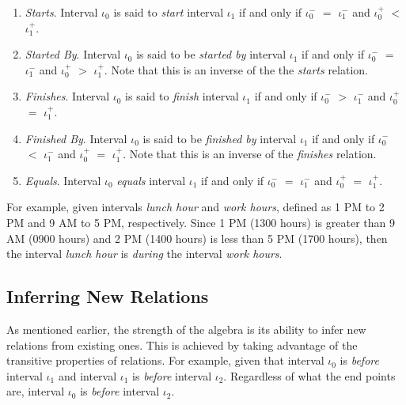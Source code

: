 \documentclass[11pt]{report}
\begin{document}
\begin{enumerate}
          \item
            {\em Starts}.
            Interval $\iota_0$ is said to {\em start} interval $\iota_1$ if and
            only if $\iota_0^-$ $=$ $\iota_1^-$ and $\iota_0^+$ $<$
            $\iota_1^+$.

          \item
            {\em Started By}.
            Interval $\iota_0$ is said to be {\em started by} interval
            $\iota_1$ if and only if $\iota_0^-$ $=$ $\iota_1^-$ and
            $\iota_0^+$ $>$ $\iota_1^+$. Note that this is an inverse of the
            the {\em starts} relation.

          \item
            {\em Finishes}.
            Interval $\iota_0$ is said to {\em finish} interval $\iota_1$ if
            and only if $\iota_0^-$ $>$ $\iota_1^-$ and $\iota_0^+$ $=$
            $\iota_1^+$.

          \item
            {\em Finished By}.
            Interval $\iota_0$ is said to be {\em finished by} interval
            $\iota_1$ if and only if $\iota_0^-$ $<$ $\iota_1^-$ and
            $\iota_0^+$ $=$ $\iota_1^+$. Note that this is an inverse of the
            {\em finishes} relation.

          \item
            {\em Equals}.
            Interval $\iota_0$ {\em equals} interval $\iota_1$ if and only if
            $\iota_0^-$ $=$ $\iota_1^-$ and $\iota_0^+$ $=$ $\iota_1^+$.
        \end{enumerate}

        For example, given intervals {\em lunch hour} and {\em work hours},
        defined as 1 PM to 2 PM and 9 AM to 5 PM, respectively. Since 1 PM
        (1300 hours) is greater than 9 AM (0900 hours) and 2 PM (1400 hours) is
        less than 5 PM (1700 hours), then the interval {\em lunch hour} is
        {\em during} the interval {\em work hours}.

      \subsection{Inferring New Relations}
        \label{subs-tempo-infer}

        As mentioned earlier, the strength of the algebra is its ability to
        infer new relations from existing ones. This is achieved by taking
        advantage of the transitive properties of relations. For example,
        given that interval $\iota_0$ is {\em before} interval $\iota_1$ and
        interval $\iota_1$ is {\em before} interval $\iota_2$. Regardless of
        what the end points are, interval $\iota_0$ is {\em before} interval
        $\iota_2$.
\end{document}
